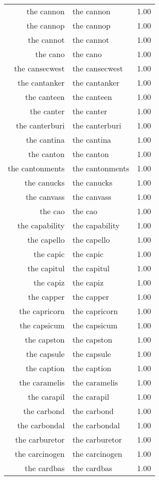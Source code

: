 \begin{table}[ht]
\begin{tabular}{rlr}
  the cannon & the cannon & 1.00 \\ 
  the cannop & the cannop & 1.00 \\ 
  the cannot & the cannot & 1.00 \\ 
  the cano & the cano & 1.00 \\ 
  the cansecwest & the cansecwest & 1.00 \\ 
  the cantanker & the cantanker & 1.00 \\ 
  the canteen & the canteen & 1.00 \\ 
  the canter & the canter & 1.00 \\ 
  the canterburi & the canterburi & 1.00 \\ 
  the cantina & the cantina & 1.00 \\ 
  the canton & the canton & 1.00 \\ 
  the cantonments & the cantonments & 1.00 \\ 
  the canucks & the canucks & 1.00 \\ 
  the canvass & the canvass & 1.00 \\ 
  the cao & the cao & 1.00 \\ 
  the capability & the capability & 1.00 \\ 
  the capello & the capello & 1.00 \\ 
  the capic & the capic & 1.00 \\ 
  the capitul & the capitul & 1.00 \\ 
  the capiz & the capiz & 1.00 \\ 
  the capper & the capper & 1.00 \\ 
  the capricorn & the capricorn & 1.00 \\ 
  the capsicum & the capsicum & 1.00 \\ 
  the capston & the capston & 1.00 \\ 
  the capsule & the capsule & 1.00 \\ 
  the caption & the caption & 1.00 \\ 
  the caramelis & the caramelis & 1.00 \\ 
  the carapil & the carapil & 1.00 \\ 
  the carbond & the carbond & 1.00 \\ 
  the carbondal & the carbondal & 1.00 \\ 
  the carburetor & the carburetor & 1.00 \\ 
  the carcinogen & the carcinogen & 1.00 \\ 
  the cardbas & the cardbas & 1.00 \\ 

\end{tabular}
\end{table}
